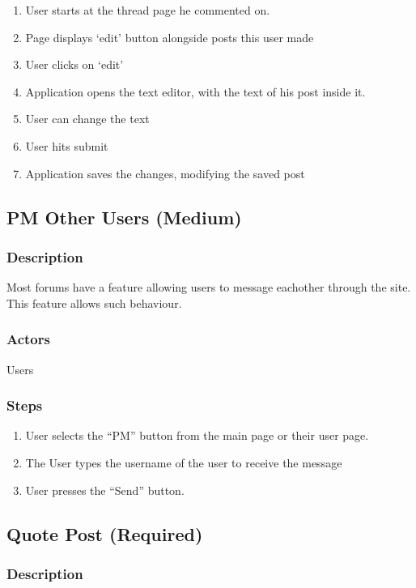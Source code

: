 \documentclass[12pt]{scrartcl}
\begin{document}
\begin{enumerate}
\item User starts at the thread page he commented on.
\item Page displays ‘edit’ button alongside posts this user made
\item User clicks on ‘edit’
\item Application opens the text editor, with the text of his post inside it.
\item User can change the text
\item User hits submit
\item  Application saves the changes, modifying the saved post
\end{enumerate}

\subsection{PM Other Users (Medium)}
\subsubsection{Description}

Most forums have a feature allowing users to message eachother through the site. This
feature allows such behaviour.

\subsubsection{Actors}

Users

\subsubsection{Steps}
\begin{enumerate}
\item User selects the ``PM'' button from the main page or their user page.
\item The User types the username of the user to receive the message
\item User presses the ``Send'' button.
\end{enumerate}

\subsection{Quote Post (Required)}
\subsubsection{Description}
\end{document}
